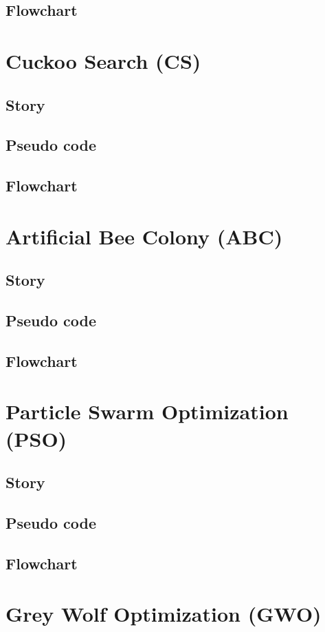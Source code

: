 \documentclass[border=0.2cm]{report}
\begin{document}
\section{Flowchart}

\chapter{Cuckoo Search (CS)}
\section{Story}
\section{Pseudo code}
\section{Flowchart}

\chapter{Artificial Bee Colony (ABC)}
\section{Story}
\section{Pseudo code}
\section{Flowchart}

\chapter{Particle Swarm Optimization (PSO)}
\section{Story}
\section{Pseudo code}
\section{Flowchart}

\chapter{Grey Wolf Optimization (GWO)}
\end{document}
